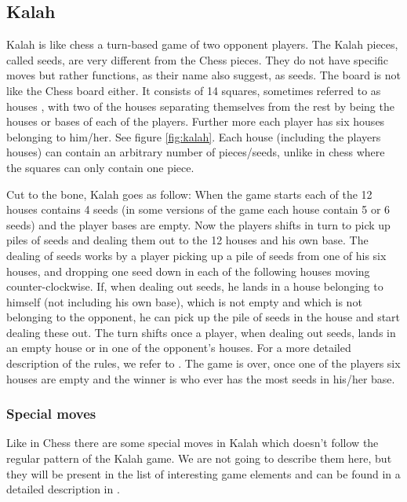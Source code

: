 \subsection{Kalah}

Kalah is like chess a turn-based game of two opponent players. The Kalah pieces, called seeds, are very different from the Chess pieces. They do not have specific moves but rather functions, as their name also suggest, as seeds. The board is not like the Chess board either. It consists of 14 squares, sometimes referred to as houses \cite{kalahrules}, with two of the houses separating themselves from the rest by being the houses or bases of each of the players. Further more each player has six houses belonging to him/her. See figure \ref{fig:kalah}. Each house (including the players houses) can contain an arbitrary number of pieces/seeds, unlike in chess where the squares can only contain one piece.  

Cut to the bone, Kalah goes as follow: When the game starts each of the 12 houses contains 4 seeds (in some versions of the game each house contain 5 or 6 seeds) and the player bases are empty. Now the players shifts in turn to pick up piles of seeds and dealing them out to the 12 houses and his own base. The dealing of seeds works by a player picking up a pile of seeds from one of his six houses, and dropping one seed down in each of the following houses moving counter-clockwise. If, when dealing out seeds, he lands in a house belonging to himself (not including his own base), which is not empty and which is not belonging to the opponent, he can pick up the pile of seeds in the house and start dealing these out. The turn shifts once a player, when dealing out seeds, lands in an empty house or in one of the opponent's houses. For a more detailed description of the rules, we refer to \cite{kalahrules}. The game is over, once one of the players six houses are empty and the winner is who ever has the most seeds in his/her base.


\subsubsection{Special moves}
Like in Chess there are some special moves in Kalah which doesn't follow the regular pattern of the Kalah game. We are not going to describe them here, but they will be present in the list of interesting game elements and can be found in a detailed description in \cite{kalahrules}.

